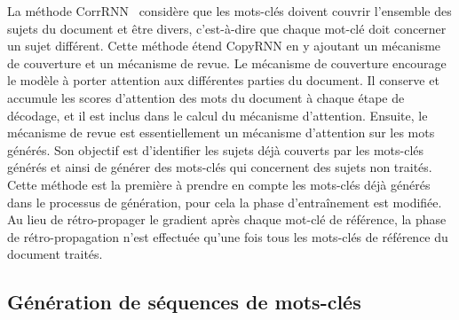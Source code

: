 La méthode CorrRNN~\cite{chen_keyphrase_2018} considère que les mots-clés doivent couvrir l'ensemble des sujets du document et être divers, c'est-à-dire que chaque mot-clé doit concerner un sujet différent.
Cette méthode étend CopyRNN en y ajoutant un mécanisme de couverture et un mécanisme de revue.
Le mécanisme de couverture encourage le modèle à porter attention aux différentes parties du document.
Il conserve et accumule les scores d'attention des mots du document à chaque étape de décodage, et il est inclus dans le calcul du mécanisme d'attention.
Ensuite, le mécanisme de revue est essentiellement un mécanisme d'attention sur les mots générés.
Son objectif est d'identifier les sujets déjà couverts par les mots-clés générés et ainsi de générer des mots-clés qui concernent des sujets non traités.
Cette méthode est la première à prendre en compte les mots-clés déjà générés dans le processus de génération, pour cela la phase d'entraînement est modifiée.
Au lieu de rétro-propager le gradient après chaque mot-clé de référence, la phase de rétro-propagation n'est effectuée qu'une fois tous les mots-clés de référence du document traités.

\subsection{Génération de séquences de mots-clés}%
\label{sub:generation_de_sequences_de_mots_cles}

